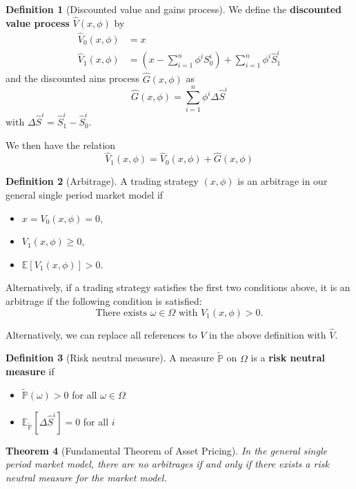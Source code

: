 \documentclass[10pt, oneside, reqno]{amsart}
\theoremstyle{plain}%
\newtheorem{thm}{Theorem}[subsection]
\theoremstyle{definition}
\newtheorem{defn}[thm]{Definition}
\theoremstyle{remark}
\newcommand{\expc}[1]{\mathbb{E}\left[#1\right]}
\newcommand{\sumni}{\sum_{i=1}^n}
\newcommand{\rnm}{\tilde{\mathbb{P}}}
\begin{document}
\begin{defn}[Discounted value and gains process]
We define the \textbf{discounted value process} $\hat{V}(x,\phi)$ by \begin{align*}
	\hat{V}_0 (x,\phi) &= x \\
	\hat{V}_1 (x,\phi) &= (x - \sumni \phi^i S^i_0) + \sumni \phi^i \hat{S}^i_1
\end{align*}
and the discounted ains process $\hat{G}(x,\phi)$ as \[
	\hat{G}(x,\phi) = \sumni \phi^i \Delta \hat{S}^i
\] with $\Delta \hat{S}^i = \hat{S}^i_1 - \hat{S}^i_0$.
\end{defn}

We then have the relation \[
	\hat{V}_1(x,\phi) = \hat{V}_0(x,\phi) + \hat{G}(x,\phi)
\]


\begin{defn}[Arbitrage]
	
	A trading strategy $(x,\phi)$ is an arbitrage in our general single period market model if
	\begin{itemize}
		\item $x = V_0(x,\phi) = 0$, 
		\item $V_1(x,\phi) \geq 0$,
		\item $\expc{V_1(x,\phi)} > 0$. 
	\end{itemize}
	
	Alternatively, if a trading strategy satisfies the first two conditions above, it is an arbitrage if the following condition is satisfied: \[
		\text{There exists } \omega \in \Omega \text{ with } V_1(x,\phi) > 0.
	\]

Alternatively, we can replace all references to $V$ in the above definition with $\hat{V}$.
\end{defn}

\begin{defn}[Risk neutral measure]
	A measure $\rnm$ on $\Omega$ is a \textbf{risk neutral measure} if 
	\begin{itemize}
		\item $\rnm(\omega) > 0$ for all $\omega \in \Omega$
		\item $\mathbb{E}_{\rnm} \left[\Delta \hat{S}^i \right] = 0$ for all $i$
	\end{itemize}
\end{defn}

\begin{thm}[Fundamental Theorem of Asset Pricing]
	In the general single period market model, there are no arbitrages if and only if there exists a risk neutral measure for the market model.
\end{thm}
\end{document}
